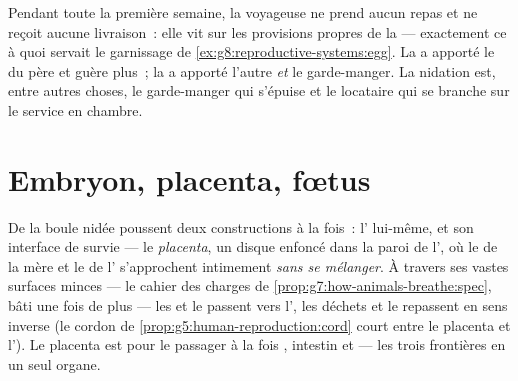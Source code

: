 \begin{example}\label{ex:g8:from-egg-to-birth:provisions}
Pendant toute la première semaine, la voyageuse ne prend aucun repas
et ne reçoit aucune livraison~: elle vit sur les provisions propres
de la  --- exactement ce à quoi servait le garnissage de
\cref{ex:g8:reproductive-systems:egg}. La  a apporté le
 du père et guère plus~; la  a apporté l'autre 
\emph{et} le garde-manger. La nidation est, entre autres choses, le
garde-manger qui s'épuise et le locataire qui se branche sur le
service en chambre.
\end{example}

\section{Embryon, placenta, fœtus}

\begin{definition}[Le placenta]\label{def:g8:from-egg-to-birth:placenta}
De la boule nidée poussent deux constructions à la fois~:
l'\emph{} lui-même, et son interface de survie --- le
\emph{placenta}, un disque enfoncé dans la paroi de
l', où le  de la mère et le  de l' s'approchent
intimement \emph{sans se mélanger}. À travers ses vastes surfaces
minces --- le cahier des charges de
\cref{prop:g7:how-animals-breathe:spec}, bâti une fois de plus ---
les  et le  passent vers l', les déchets
et le  repassent en sens inverse (le cordon de
\cref{prop:g5:human-reproduction:cord} court entre le placenta et
l'). Le placenta est pour le passager à la fois ,
intestin et  --- les trois frontières en un seul organe.
\end{definition}


